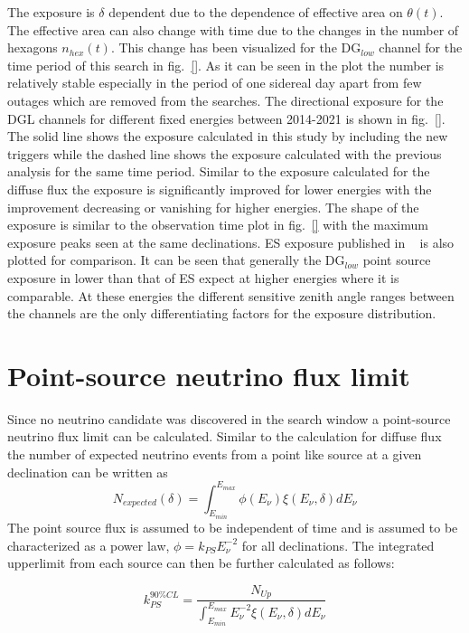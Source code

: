 The exposure is $\delta$ dependent due to the dependence of effective area on $\theta(t)$. The effective area can also change with time due to the changes in the number of hexagons $n_{hex}(t)$. This change has been visualized for the DG$_{low}$ channel for the time period of this search in fig.~\ref{}. As it can be seen in the plot the number is relatively stable especially in the period of one sidereal day apart from few outages which are removed from the searches. The directional exposure for the DGL channels for different fixed energies between 2014-2021 is shown in fig.~\ref{}. The solid line shows the exposure calculated in this study by including the new triggers while the dashed line shows the exposure calculated with the previous analysis for the same time period. Similar to the exposure calculated for the diffuse flux the exposure is significantly improved for lower energies with the improvement decreasing or vanishing for higher energies. The shape of the exposure is similar to the observation time plot in fig.~\ref{} with the maximum exposure peaks seen at the same declinations. ES exposure published in ~\cite{} is also plotted for comparison. It can be seen that generally the DG$_{low}$ point source exposure in lower than that of ES expect at higher energies where it is comparable. At these energies the different sensitive zenith angle ranges between the channels are the only differentiating factors for the exposure distribution. 

\section{Point-source neutrino flux limit}
\label{sec:pfux_limit}
Since no neutrino candidate was discovered in the search window a point-source neutrino flux limit can be calculated. Similar to the calculation for diffuse flux the number of expected neutrino events from a point like source at a given declination can be written as 
\begin{equation}
  N_{expected}(\delta) = \int_{E_{min}}^{E_{max}}  \phi(E_{\nu})  \xi(E_{\nu}, \delta) dE_{\nu}
\end{equation}
The point source flux is assumed to be independent of time and is assumed to be characterized as a power law, $\phi = k_{PS} E_{\nu}^{-2}$ for all declinations. The integrated upperlimit from each source can then be further calculated as follows:

\begin{equation}
  k_{PS}^{90\%CL} = \frac{N_{Up}}{\int_{E_{min}}^{E_{max}} E_{\nu}^{-2} \xi(E_{\nu}, \delta) dE_{\nu}}
\end{equation}

